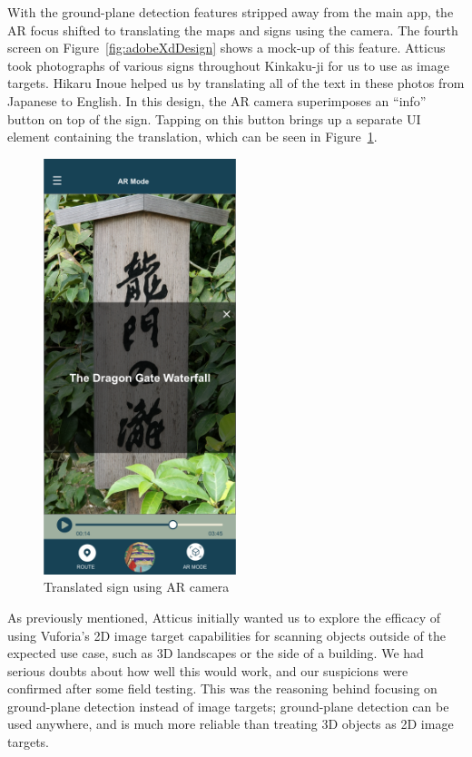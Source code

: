 \documentclass[a4paper, 10pt, american, titlepage]{article}
\begin{document}
With the ground-plane detection features stripped away from the main app, the
AR focus shifted to translating the maps and signs using the camera. The fourth
screen on Figure~\ref{fig:adobeXdDesign} shows a mock-up of this feature.
Atticus took photographs of various signs throughout Kinkaku-ji for us to use as
image targets. Hikaru Inoue helped us by translating all of the text in these
photos from Japanese to English. In this design, the AR camera superimposes an
``info'' button on top of the sign. Tapping on this button brings up a separate
UI element containing the translation, which can be seen in
Figure~\ref{fig:signTranslation}.

\begin{figure}[h] \centering
    \includegraphics[width=0.5\textwidth]{sign-translation.png}
    \caption{Translated sign using AR camera}
    \label{fig:signTranslation}
\end{figure}

As previously mentioned, Atticus initially wanted us to explore the efficacy of
using Vuforia's 2D image target capabilities for scanning objects outside of
the expected use case, such as 3D landscapes or the side of a building. We had
serious doubts about how well this would work, and our suspicions were
confirmed after some field testing. This was the reasoning behind focusing on
ground-plane detection instead of image targets; ground-plane detection can be
used anywhere, and is much more reliable than treating 3D objects as 2D image
targets.
\end{document}
